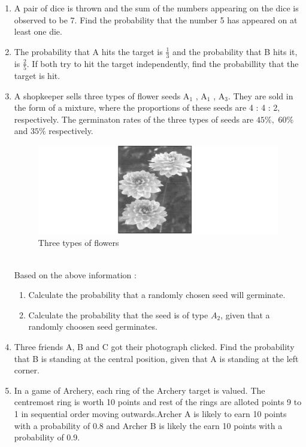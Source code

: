 \begin{enumerate}
\item A pair of dice is thrown and the sum of the numbers appearing on the dice is observed to be 7. Find the probability that the number 5 has appeared on at least one die.
\item The probability that A hits the target is $\frac{1}{3}$ and the probability that B hits it, is $\frac{2}{5}.$ If both try to hit the target independently, find the probabillity that the target is hit. 
\item A shopkeeper sells three types of flower seeds A$_1$ , A$_1$ , A$_3$. They are sold in the form of a mixture, where the proportions of these seeds are  4 : 4 : 2, respectively. The germinaton rates of the three types of seeds are $45\%,$ $60\%$ and $35\%$ respectively.
\begin{figure}[!ht]
\centering                                  \includegraphics[width=\columnwidth]{figs/flowers}                                     
\caption{Three types of flowers}            
\label{fig:flowers11}                       
\end{figure}
\\ Based on  the above information :
\begin{enumerate}
\item  Calculate the probability that a randomly chosen seed will germinate.
\item  Calculate the probability  that the seed is of type $A_2$, given that a randomly choosen seed germinates.
\end{enumerate}
\item Three friends A, B and C got their photograph clicked. Find the probability that B is standing at the central position, given that A is standing at the left corner.
\item In a game of Archery, each ring of the Archery target is valued. The centremost ring is worth 10 points and rest of the rings are alloted points 9 to 1 in sequential order moving outwards.Archer A is likely to earn 10 points with a probability of 0.8 and Archer B is likely the earn 10 points with a probability of 0.9.

\end{enumerate}
